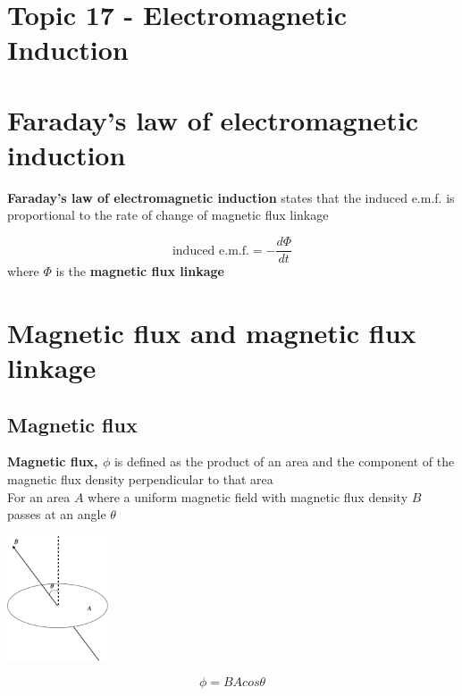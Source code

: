 \documentclass[a4paper, 10pt]{article}
\begin{document}
\section*{Topic 17 - Electromagnetic Induction}

\section{Faraday's law of electromagnetic induction}

\begin{framed}
   \textbf{Faraday's law of electromagnetic induction} states that the induced e.m.f. is proportional to the rate of change of magnetic flux linkage

   \[
      \text{induced e.m.f.} = -\frac{d \Phi}{dt} 
   \]
   where $\Phi$ is the \textbf{magnetic flux linkage}
\end{framed}	

\section{Magnetic flux and magnetic flux linkage}

\subsection{Magnetic flux}

\begin{framed}
   \textbf{Magnetic flux, $\phi$ }is defined as the product of an area and the component of the magnetic flux density perpendicular to that area \\

   For an area $A$ where a uniform magnetic field with magnetic flux density $B$ passes at an angle $\theta$ 
   \begin{center}
      \includegraphics[width=3cm]{figures/1.pdf} 
   \end{center}	

   \[
      \phi = BA cos \theta
   \]
   
\end{framed}	
\end{document}
